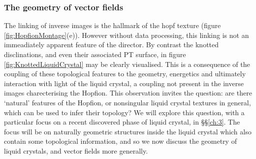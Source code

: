 \subsubsection{The geometry of vector fields}
\label{subsec:Geometry}
The linking of inverse images is the hallmark of the hopf texture (figure \ref{fig:HopfionMontage}(e)). However without data processing, this linking is not an immeadiately apparent feature of the director. By contrast the knotted disclinations, and even their associated PT surface, in figure \ref{fig:KnottedLiquidCrystal} may be clearly visualised. This is a consequence of the coupling of these topological features to the geometry, energetics and ultimately interaction with light of the liquid crystal, a coupling not present in the inverse images charecterising the Hopfion. This observation invites the question: are there `natural' features of the Hopfion, or nonsingular liquid crystal textures in general, which can be used to infer their topology? We will explore this question, with a particular focus on a recent discovered phase of liquid crystal, in \S\S\ref{ch:3}. The focus will be on naturally geometric structures inside the liquid crystal which also contain some topological information, and so we now discuss the geometry of liquid crystals, and vector fields more generally. 

